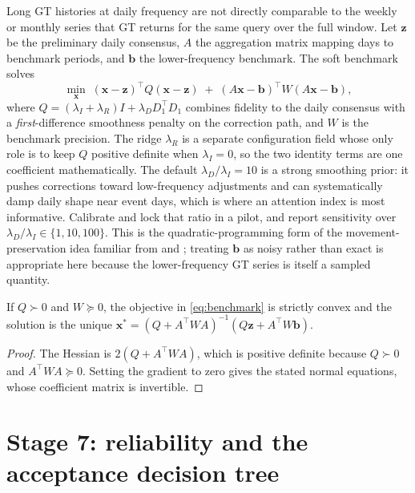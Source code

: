 \documentclass[12pt,a4paper,oneside]{article}
\begin{document}
Long GT histories at daily frequency are not directly comparable to the weekly
or monthly series that GT returns for the same query over the full window. Let
$\bm{z}$ be the preliminary daily consensus, $A$ the aggregation matrix mapping
days to benchmark periods, and $\bm{b}$ the lower-frequency benchmark. The soft
benchmark solves
\begin{equation}
\min_{\bm{x}}\;
(\bm{x}-\bm{z})^{\top}Q(\bm{x}-\bm{z})
\;+\;
(A\bm{x}-\bm{b})^{\top}W(A\bm{x}-\bm{b}),
\label{eq:benchmark}
\end{equation}
where $Q = (\lambda_I+\lambda_R)I + \lambda_D D_1^{\top}D_1$ combines fidelity to
the daily consensus with a \emph{first}-difference smoothness penalty on the
correction path, and $W$ is the benchmark precision. The ridge $\lambda_R$ is a
separate configuration field whose only role is to keep $Q$ positive definite
when $\lambda_I=0$, so the two identity terms are one coefficient
mathematically. The default $\lambda_D/\lambda_I = 10$ is a strong smoothing
prior: it pushes corrections toward low-frequency adjustments and can
systematically damp daily shape near event days, which is where an attention
index is most informative. Calibrate and lock that ratio in a pilot, and report
sensitivity over $\lambda_D/\lambda_I \in \{1,10,100\}$. This is the
quadratic-programming form of the movement-preservation idea familiar from
\citet{Denton1971} and \citet{ChowLin1971}; treating $\bm{b}$ as noisy rather
than exact is appropriate here because the lower-frequency GT series is itself a
sampled quantity.

\begin{proposition}\label{prop:bench}
If $Q \succ 0$ and $W \succeq 0$, the objective in \eqref{eq:benchmark} is
strictly convex and the solution is the unique
$\bm{x}^{*} = (Q + A^{\top}WA)^{-1}(Q\bm{z} + A^{\top}W\bm{b})$.
\end{proposition}

\begin{proof}
The Hessian is $2(Q + A^{\top}WA)$, which is positive definite because
$Q \succ 0$ and $A^{\top}WA \succeq 0$. Setting the gradient to zero gives the
stated normal equations, whose coefficient matrix is invertible.
\end{proof}

\section{Stage 7: reliability and the acceptance decision tree}\label{sec:decision}
\end{document}
